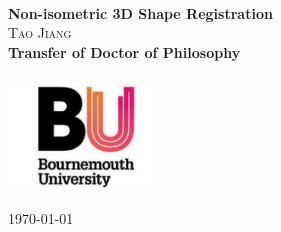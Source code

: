 \begin{titlepage}


\begin{center}
~\\[1.0cm]
{ \huge \bfseries Non-isometric 3D Shape Registration}\\[2.5cm]



{\large
\textsc{Tao Jiang}\\[2.0cm]

\textbf{Transfer of Doctor of Philosophy}\\[0.5cm]
\textbf{}\\[1.0cm]

\includegraphics[width=0.3\textwidth]{img/bu_logo}\\[1cm]

}

\vfill

{\large \today}

\end{center}

\end{titlepage}
